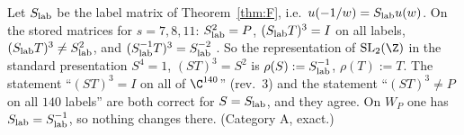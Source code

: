 \begin{remark}\label{rem:Sconv}
Let $S_{\rm lab}$ be the label matrix of Theorem~\ref{thm:F}, i.e.\ $u(-1/w)=S_{\rm lab}u(w)$. On the stored matrices for $s=7,8,11$:
$S_{\rm lab}^2=P$, $(S_{\rm lab}T)^3=I$ on all labels, $(S_{\rm lab}T)^3\neq S_{\rm lab}^2$, and $(S_{\rm lab}^{-1}T)^3=S_{\rm lab}^{-2}$ . So the representation of
$\mathrm{SL}_2(\Z)$ in the standard presentation $S^4=1$, $(ST)^3=S^2$ is $\rho(S):=S_{\rm lab}^{-1}$, $\rho(T):=T$. The statement ``$(ST)^3=I$ on all of $\C^{140}$''
(rev.~3) and the statement ``$(ST)^3\neq P$ on all $140$ labels''  are both correct for $S=S_{\rm lab}$, and they agree. On $W_P$ one has $S_{\rm lab}=S_{\rm lab}^{-1}$,
so nothing changes there. (Category A, exact.)
\end{remark}


